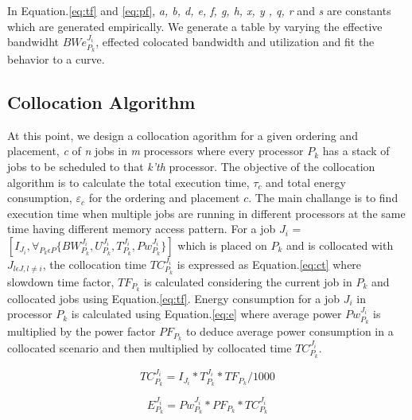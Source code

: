 In Equation.\ref{eq:tf} and \ref{eq:pf}, \emph{a, b, d, e, f, g, h, x, y , q, r} and \emph{s} are constants which 
are generated empirically. We generate a table by varying the effective bandwidht $BWe_{P_k}^{J_i}$, effected colocated 
bandwidth and utilization and fit the behavior to a curve.

\subsection{Collocation Algorithm}
At this point, we design a collocation agorithm for a given ordering and placement, \emph{c} of \emph{n} jobs in \emph{m} 
processors where every processor $P_k$ has a stack of jobs to be scheduled to that \emph{k'th} processor. The objective of 
the collocation
algorithm is to calculate the total execution time, $\tau_c$ and total energy consumption, $\varepsilon_c$ for the ordering 
and placement $c$.
The main challange is to find execution time when multiple jobs are running in different processors at the same time
having different memory access pattern. For a job $J_i$ = $[I_{J_i},\forall_{P_k\epsilon P}\{BW_{P_k}^{J_i}, 
U_{P_k}^{J_i}, T_{P_k}^{J_i}, Pw_{P_k}^{J_i}\}]$ which is placed on $P_k$ and is collocated with $J_{l\epsilon J, l \neq i}$, 
the collocation time $TC_{P_k}^{J_i}$ is expressed as Equation.\ref{eq:ct} where slowdown time factor, $TF_{P_k}$ is calculated 
considering the current job in $P_k$ and collocated jobs using Equation.\ref{eq:tf}. Energy consumption for a job $J_i$ in 
processor $P_k$ is calculated
using Equation.\ref{eq:e} where average power $Pw_{P_k}^{J_i}$ is multiplied by the power factor $PF_{P_k}$ to deduce 
average power consumption in a collocated scenario and then multiplied by collocated time $TC_{P_k}^{J_i}$.

\begin{equation}
TC_{P_k}^{J_i} = I_{J_i}*T_{P_k}^{J_i}*TF_{P_k}/1000
\label{eq:ct}
\end{equation}

\begin{equation}
E_{P_k}^{J_i} = Pw_{P_k}^{J_i}*PF_{P_k}*TC_{P_k}^{J_i}
\label{eq:e}
\end{equation}




